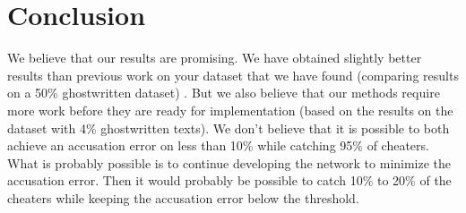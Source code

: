 \documentclass[11pt]{article}
\begin{document}
    \section{Conclusion}

    We believe that our results are promising. We have obtained slightly better
    results than previous work on your dataset that we have found (comparing
    results on a 50\% ghostwritten dataset) \citep{hansen2014,aalykke2016}. But
    we also believe that our methods require more work before they are ready for
    implementation (based on the results on the dataset with 4\% ghostwritten
    texts). We don't believe that it is possible to both achieve an accusation
    error on less than 10\% while catching 95\% of cheaters. What is probably
    possible is to continue developing the network to minimize the accusation
    error. Then it would probably be possible to catch 10\% to 20\% of the
    cheaters while keeping the accusation error below the threshold.

    
    
\end{document}
